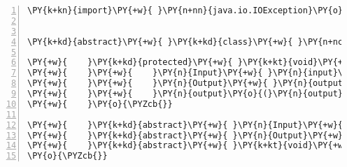 \begin{Verbatim}[commandchars=\\\{\},numbers=left,firstnumber=1,stepnumber=1,frame=single,fontsize=\small]
\PY{k+kn}{import}\PY{+w}{ }\PY{n+nn}{java.io.IOException}\PY{o}{;}


\PY{k+kd}{abstract}\PY{+w}{ }\PY{k+kd}{class}\PY{+w}{ }\PY{n+nc}{Framework}\PY{+w}{ }\PY{o}{\PYZob{}}

\PY{+w}{    }\PY{k+kd}{protected}\PY{+w}{ }\PY{k+kt}{void}\PY{+w}{ }\PY{n+nf}{run}\PY{o}{(}\PY{o}{)}\PY{+w}{ }\PY{k+kd}{throws}\PY{+w}{ }\PY{n}{Exception}\PY{+w}{ }\PY{o}{\PYZob{}}
\PY{+w}{    }\PY{+w}{    }\PY{n}{Input}\PY{+w}{ }\PY{n}{input}\PY{+w}{ }\PY{o}{=}\PY{+w}{ }\PY{n}{input}\PY{o}{(}\PY{o}{)}\PY{o}{;}
\PY{+w}{    }\PY{+w}{    }\PY{n}{Output}\PY{+w}{ }\PY{n}{output}\PY{+w}{ }\PY{o}{=}\PY{+w}{ }\PY{n}{process}\PY{o}{(}\PY{n}{input}\PY{o}{)}\PY{o}{;}
\PY{+w}{    }\PY{+w}{    }\PY{n}{output}\PY{o}{(}\PY{n}{output}\PY{o}{)}\PY{o}{;}
\PY{+w}{    }\PY{o}{\PYZcb{}}

\PY{+w}{    }\PY{k+kd}{abstract}\PY{+w}{ }\PY{n}{Input}\PY{+w}{ }\PY{n+nf}{input}\PY{o}{(}\PY{o}{)}\PY{+w}{ }\PY{k+kd}{throws}\PY{+w}{ }\PY{n}{IOException}\PY{o}{;}
\PY{+w}{    }\PY{k+kd}{abstract}\PY{+w}{ }\PY{n}{Output}\PY{+w}{ }\PY{n+nf}{process}\PY{o}{(}\PY{n}{Input}\PY{+w}{ }\PY{n}{input}\PY{o}{)}\PY{o}{;}
\PY{+w}{    }\PY{k+kd}{abstract}\PY{+w}{ }\PY{k+kt}{void}\PY{+w}{ }\PY{n+nf}{output}\PY{o}{(}\PY{n}{Output}\PY{+w}{ }\PY{n}{output}\PY{o}{)}\PY{o}{;}
\PY{o}{\PYZcb{}}
\end{Verbatim}
